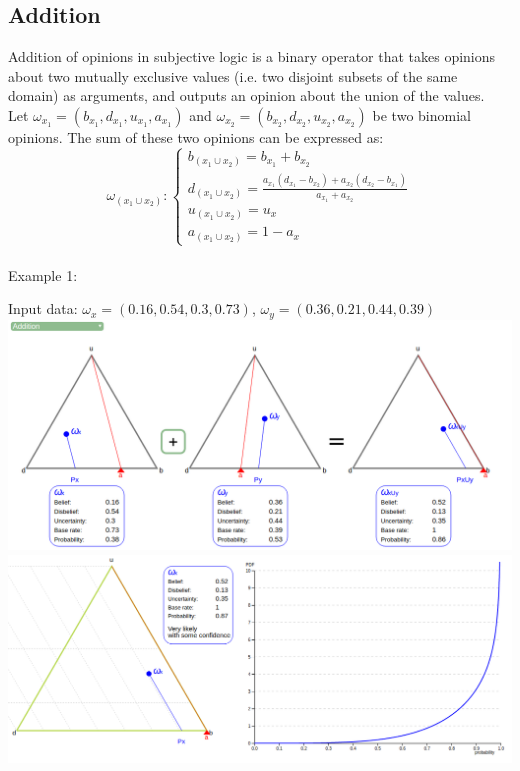 \documentclass[UTF8]{article}
\newcommand{\opinion}[5]{$\omega_{#1} = (#2, #3, #4, #5)$}
\begin{document}
\subsection{Addition}
Addition of opinions in subjective logic is a binary operator that takes opinions
about two mutually exclusive values (i.e. two disjoint subsets of the same domain)
as arguments, and outputs an opinion about the union of the values.\\
Let \opinion{x_1}{b_{x_1}}{d_{x_1}}{u_{x_1}}{a_{x_1}} and \opinion{x_2}{b_{x_2}}{d_{x_2}}{u_{x_2}}{a_{x_2}} be two binomial opinions. The sum of these two opinions can be expressed as:
$$
\omega_{(x_1 \cup x_2)}: 
\begin{cases}
    b_{(x_1 \cup x_2)} = b_{x_1} + b_{x_2}\\    
    d_{(x_1 \cup x_2)} = \frac{a_{x_1}(d_{x_1} - b_{x_2}) + a_{x_2}(d_{x_2} - b_{x_1})}{a_{x_1} + a_{x_2}}\\
    u_{(x_1 \cup x_2)} = u_x\\
    a_{(x_1 \cup x_2)} = 1 - a_x
\end{cases}
$$\\
Example 1:\\
\begin{center}
    Input data: 
    \opinion{x}{0.16}{0.54}{0.3}{0.73}, 
    \opinion{y}{0.36}{0.21}{0.44}{0.39}\\
    \includegraphics[width=6in]{images/add1.png}
    \includegraphics[width=6in]{images/add1viz.png}
\end{center}
\end{document}
